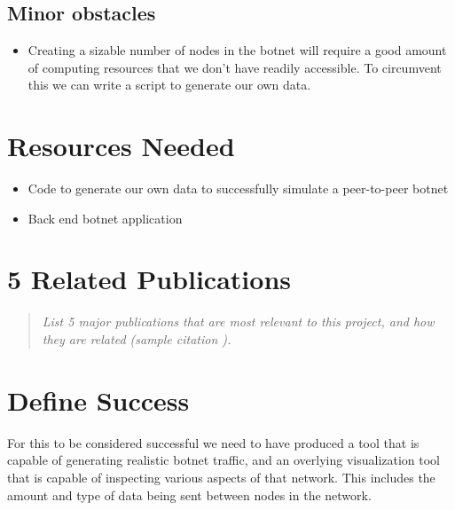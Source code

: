 \documentclass{proc}
\begin{document}
\subsection{Minor obstacles}

\begin{itemize}
\item Creating a sizable number of nodes in the botnet will require a good amount of computing resources that we don't have readily accessible. To circumvent this we can write a script to generate our own data. 
\end{itemize}
\section{Resources Needed}
\begin{itemize}
\item Code to generate our own data to successfully simulate a peer-to-peer botnet
\item Back end botnet application
\end{itemize}

\section{5 Related Publications}
\begin{quote}
\textit{List 5 major publications that are most relevant to this project, and how they are related (sample citation \cite{wijk2005value}).}
\end{quote}
\begin{itemized}
\item{}


\end{itemized}


\section{Define Success}

For this to be considered successful we need to have produced a tool that is capable of generating realistic botnet traffic, and an overlying visualization tool that is capable of inspecting various aspects of that network. This includes the amount and type of data being sent between nodes in the network.



\nocite{*}



\end{document}
